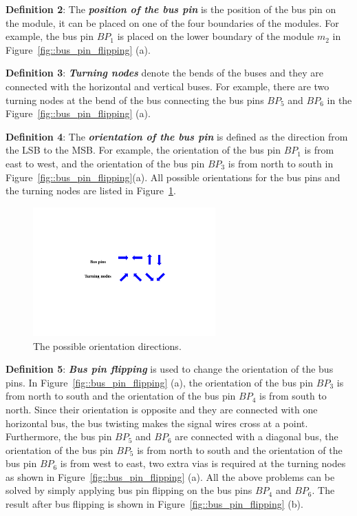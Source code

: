 {\bf Definition 2}: The \textbf{\textit{position of the bus pin}}
is the position of the bus pin on the module, it can be placed on
one of the four boundaries of the modules. For example, the bus pin
$BP_1$ is placed on the lower boundary of the module $m_2$ in
Figure~\ref{fig::bus_pin_flipping} (a).

{\bf Definition 3}:  \textbf{\textit{Turning nodes}} denote the
bends of the buses and they are connected with the horizontal and
vertical buses. For example, there are two turning nodes at the
bend of the bus connecting the bus pins $BP_5$ and $BP_6$ in the
Figure~\ref{fig::bus_pin_flipping} (a).

{\bf Definition 4}: The \textbf{\textit{orientation of the bus
pin}} is defined as the direction from the LSB to the MSB. For
example, the orientation of the bus pin $BP_1$ is from east to west,
and the orientation of the bus pin $BP_3$ is from north to south in
Figure~\ref{fig::bus_pin_flipping}(a). All possible orientations
for the bus pins and the turning nodes are listed in
Figure~\ref{fig::orientation_direction}.

\begin{figure}[htb]
  \centering
    \includegraphics[width=7cm]{Fig/orientation_direction.pdf}
     \caption{
      The possible orientation directions.
   }
  \label{fig::orientation_direction}
\end{figure}

{\bf Definition 5}: \textbf{\textit{Bus pin flipping}} is used to
change the orientation of the bus pins. In
Figure~\ref{fig::bus_pin_flipping} (a), the orientation of the bus pin
$BP_3$ is from north to south and the orientation of the bus pin
$BP_4$ is from south to north. Since their orientation is opposite and
they are connected with one horizontal bus, the bus twisting makes the signal
wires cross at a point. Furthermore, the bus pin $BP_5$ and $BP_6$ are
connected with a diagonal bus, the orientation of the bus pin $BP_5$ is from
north to south and the orientation of the bus pin $BP_6$ is from west
to east, two extra vias is required at the turning nodes as shown in Figure~\ref{fig::bus_pin_flipping} (a).
All the above problems can be solved
by simply applying bus pin flipping on the bus pins $BP_4$ and $BP_6$.
The result after bus flipping is shown in Figure~\ref{fig::bus_pin_flipping} (b).

